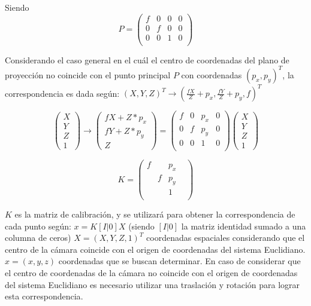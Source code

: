 Siendo
\[
P = 
\begin{pmatrix}
f & 0 & 0 & 0 \\
0 & f & 0 & 0 \\
0 & 0 & 1 & 0 \\
\end{pmatrix}
\]

Considerando el caso general en el cuál el centro de coordenadas del plano de proyección no coincide con el punto principal $P$ con coordenadas $(p_x,p_y)^T$, la correspondencia es dada según:
$(X,Y,Z)^T \to (\frac{fX}{Z} + p_x, \frac{fY}{Z} + p_y, f)^T$

\[
\begin{pmatrix}
X \\ Y \\ Z \\ 1
\end{pmatrix}
\to
\begin{pmatrix}
fX + Z * p_x \\ fY + Z * p_y \\ Z
\end{pmatrix}
=
\begin{pmatrix}
f & 0 & p_x & 0 \\
0 & f & p_y & 0 \\
0 & 0 & 1 & 0 \\
\end{pmatrix}
\begin{pmatrix}
X \\ Y \\ Z \\ 1
\end{pmatrix}
\]

\[
K =
\begin{pmatrix}
f &   & p_x & \\
  & f & p_y & \\
  &   & 1   & \\
\end{pmatrix}
\]

$K$ es la matriz de calibración, y se utilizará para obtener la correspondencia de cada punto según:
$x = K [I|0] X$
(siendo $[I|0]$ la matriz identidad sumado a una columna de ceros)
$X = (X,Y,Z,1)^T$ coordenadas espaciales considerando que el centro de la cámara coincide con el origen de coordenadas del sistema Euclidiano.
$x = (x, y, z)$ coordenadas que se buscan determinar.
En caso de considerar que el centro de coordenadas de la cámara no coincide con el origen de coordenadas del sistema Euclidiano es necesario utilizar una traslación y rotación para lograr esta correspondencia\cite{LibroCompGrafica3}.


